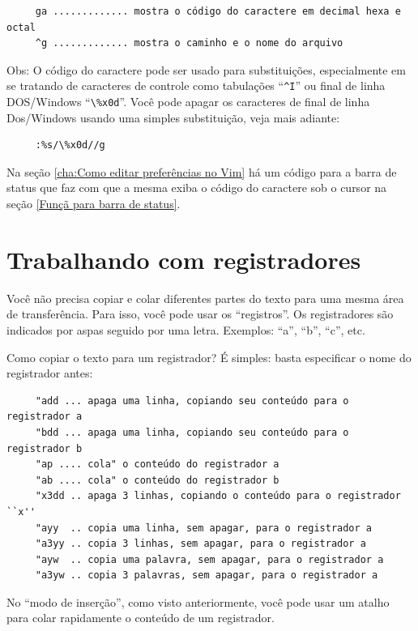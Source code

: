 \documentclass[10pt,a4paper,openany]{book}
\begin{document}
\begin{verbatim}
     ga ............. mostra o código do caractere em decimal hexa e octal
     ^g ............. mostra o caminho e o nome do arquivo
\end{verbatim}

Obs: O código do caractere pode ser usado para substituições,
especialmente em se tratando de caracteres de controle como tabulações
``\verb|^I|'' ou final de linha DOS/Windows ``\verb|\%x0d|''. Você pode apagar os
caracteres de final de linha Dos/Windows usando uma simples
substituição, veja mais adiante:

\begin{verbatim}
     :%s/\%x0d//g
\end{verbatim}

Na seção \ref{cha:Como editar preferências no Vim} há um código para a barra de
status que faz com que a mesma exiba o código do caractere sob o cursor na
seção \ref{Funçã para barra de status}.

\section{Trabalhando com registradores}
\label{Trabalhando com registradores}

Você não precisa copiar e colar diferentes partes do texto para uma
mesma área de transferência.  Para isso, você pode usar os
``registros''.  Os registradores são indicados por aspas seguido por uma letra.
Exemplos: ``a'', ``b'', ``c'', etc.

Como copiar o texto para um registrador? É simples: basta especificar
o nome do registrador antes:

\begin{verbatim}
     "add ... apaga uma linha, copiando seu conteúdo para o registrador a
     "bdd ... apaga uma linha, copiando seu conteúdo para o registrador b
     "ap .... cola" o conteúdo do registrador a
     "ab .... cola" o conteúdo do registrador b
     "x3dd .. apaga 3 linhas, copiando o conteúdo para o registrador ``x''
     "ayy  .. copia uma linha, sem apagar, para o registrador a
     "a3yy .. copia 3 linhas, sem apagar, para o registrador a
     "ayw  .. copia uma palavra, sem apagar, para o registrador a
     "a3yw .. copia 3 palavras, sem apagar, para o registrador a
\end{verbatim}

No ``modo de inserção'', como visto anteriormente, você pode usar um atalho
para colar rapidamente o conteúdo de um registrador.
\end{document}
